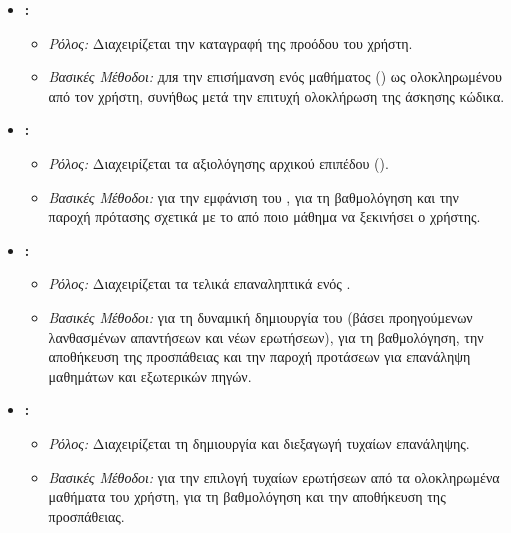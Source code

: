 \begin{itemize}[leftmargin=*, noitemsep]
\begin{itemize}[leftmargin=+, noitemsep]
        \end{itemize}
    \item \textbf{\texttt{}:}
        \begin{itemize}[leftmargin=+, noitemsep]
            \item \textit{Ρόλος:} Διαχειρίζεται την καταγραφή της προόδου του χρήστη.
            \item \textit{Βασικές Μέθοδοι:} \texttt{} для την επισήμανση ενός μαθήματος () ως ολοκληρωμένου από τον χρήστη, συνήθως μετά την επιτυχή ολοκλήρωση της άσκησης κώδικα.
        \end{itemize}
    \item \textbf{\texttt{}:}
        \begin{itemize}[leftmargin=+, noitemsep]
            \item \textit{Ρόλος:} Διαχειρίζεται τα  αξιολόγησης αρχικού επιπέδου ().
            \item \textit{Βασικές Μέθοδοι:} \texttt{} για την εμφάνιση του , \texttt{} για τη βαθμολόγηση και την παροχή πρότασης σχετικά με το από ποιο μάθημα να ξεκινήσει ο χρήστης.
        \end{itemize}
    \item \textbf{\texttt{}:}
        \begin{itemize}[leftmargin=+, noitemsep]
            \item \textit{Ρόλος:} Διαχειρίζεται τα τελικά επαναληπτικά  ενός .
            \item \textit{Βασικές Μέθοδοι:} \texttt{} για τη δυναμική δημιουργία του  (βάσει προηγούμενων λανθασμένων απαντήσεων και νέων ερωτήσεων), \texttt{} για τη βαθμολόγηση, την αποθήκευση της προσπάθειας και την παροχή προτάσεων για επανάληψη μαθημάτων και εξωτερικών πηγών.
        \end{itemize}
    \item \textbf{\texttt{}:}
        \begin{itemize}[leftmargin=+, noitemsep]
            \item \textit{Ρόλος:} Διαχειρίζεται τη δημιουργία και διεξαγωγή τυχαίων  επανάληψης.
            \item \textit{Βασικές Μέθοδοι:} \texttt{} για την επιλογή τυχαίων ερωτήσεων από τα ολοκληρωμένα μαθήματα του χρήστη, \texttt{} για τη βαθμολόγηση και την αποθήκευση της προσπάθειας.

\end{itemize}
\end{itemize}
